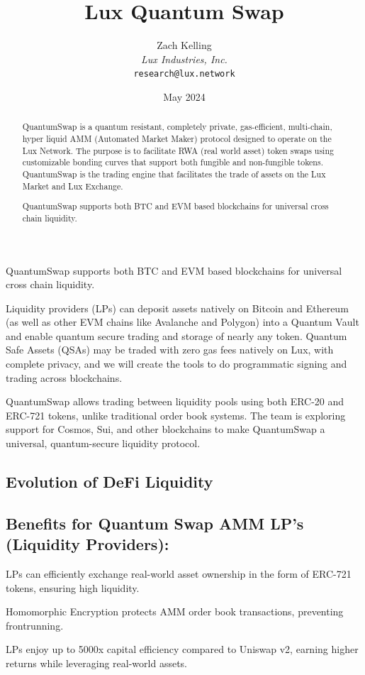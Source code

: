 \documentclass[11pt]{article}
\title{Lux Quantum Swap}
\author{Zach Kelling\\\textit{Lux Industries, Inc.}\\\texttt{research@lux.network}}
\date{May 2024}
\begin{document}
\luxcoverpage

\begin{abstract}
QuantumSwap is a quantum resistant, completely private, gas-efficient, multi-chain, hyper liquid AMM (Automated Market Maker) protocol designed to operate on the Lux Network. The purpose is to facilitate RWA (real world asset) token swaps using customizable bonding curves that support both fungible and non-fungible tokens. QuantumSwap is the trading engine that facilitates the trade of assets on the Lux Market and Lux Exchange.

QuantumSwap supports both BTC and EVM based blockchains for universal cross chain liquidity.
\end{abstract}

\tableofcontents
\newpage


QuantumSwap supports both BTC and EVM based blockchains for universal cross chain liquidity.


Liquidity providers (LPs) can deposit assets natively on Bitcoin and Ethereum (as well as other EVM chains like Avalanche and Polygon) into a Quantum Vault and enable quantum secure trading and storage of nearly any token. Quantum Safe Assets (QSAs) may be traded with zero gas fees natively on Lux, with complete privacy, and we will create the tools to do programmatic signing and trading across blockchains.


QuantumSwap allows trading between liquidity pools using both ERC-20 and ERC-721 tokens, unlike traditional order book systems. The team is exploring support for Cosmos, Sui, and other blockchains to make QuantumSwap a universal, quantum-secure liquidity protocol.


\subsection{Evolution of DeFi Liquidity}

\subsection{Benefits for Quantum Swap AMM LP's (Liquidity Providers):}

LPs can efficiently exchange real-world asset ownership in the form of ERC-721 tokens, ensuring high liquidity.


Homomorphic Encryption protects AMM order book transactions, preventing frontrunning.


LPs enjoy up to 5000x capital efficiency compared to Uniswap v2, earning higher returns while leveraging real-world assets.
\end{document}
